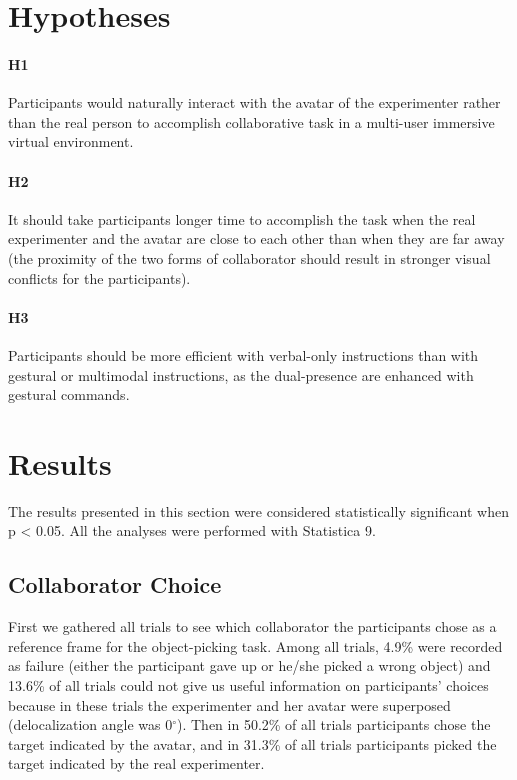 
\section{Hypotheses}

\paragraph{H1}
Participants would naturally interact with the avatar of the experimenter rather than the real person to accomplish collaborative task in a multi-user immersive virtual environment.

\paragraph{H2} It should take participants longer time to accomplish the task when the real experimenter and the avatar are close to each other than when they are far away (the proximity of the two forms of collaborator should result in stronger visual conflicts for the participants).

\paragraph{H3} Participants should be more efficient with verbal-only instructions than with gestural or multimodal instructions, as the dual-presence are enhanced with gestural commands.



\section{Results}
The results presented in this section were considered statistically significant when p \textless{} 0.05. All the analyses were performed with Statistica 9.

\subsection{Collaborator Choice}
First we gathered all trials to see which collaborator the participants chose as a reference frame for the object-picking task. Among all trials, 4.9\% were recorded as failure (either the participant gave up or he/she picked a wrong object) and 13.6\% of all trials could not give us useful information on participants' choices because in these trials the experimenter and her avatar were superposed (delocalization angle was 0$^\circ$). Then in 50.2\% of all trials participants chose the target indicated by the avatar, and in 31.3\% of all trials participants picked the target indicated by the real experimenter.

